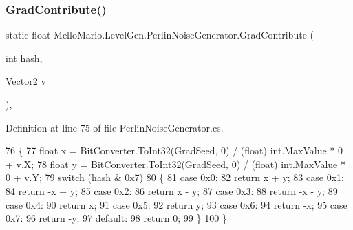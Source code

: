 \subsubsection{Grad\+Contribute()}
{\footnotesize\ttfamily static float Mello\+Mario.\+Level\+Gen.\+Perlin\+Noise\+Generator.\+Grad\+Contribute (\begin{DoxyParamCaption}\item[{int}]{hash,  }\item[{Vector2}]{v }\end{DoxyParamCaption})\hspace{0.3cm}{\ttfamily [static]}, {\ttfamily [private]}}



Definition at line 75 of file Perlin\+Noise\+Generator.\+cs.


\begin{DoxyCode}
76         \{
77             \textcolor{keywordtype}{float} x = BitConverter.ToInt32(GradSeed, 0) / (float) \textcolor{keywordtype}{int}.MaxValue * 0 + v.X;
78             \textcolor{keywordtype}{float} y = BitConverter.ToInt32(GradSeed, 0) / (float) \textcolor{keywordtype}{int}.MaxValue * 0 + v.Y;
79             switch (hash & 0x7)
80             \{
81                 \textcolor{keywordflow}{case} 0x0:
82                     \textcolor{keywordflow}{return} x + y;
83                 \textcolor{keywordflow}{case} 0x1:
84                     \textcolor{keywordflow}{return} -x + y;
85                 \textcolor{keywordflow}{case} 0x2:
86                     \textcolor{keywordflow}{return} x - y;
87                 \textcolor{keywordflow}{case} 0x3:
88                     \textcolor{keywordflow}{return} -x - y;
89                 \textcolor{keywordflow}{case} 0x4:
90                     \textcolor{keywordflow}{return} x;
91                 \textcolor{keywordflow}{case} 0x5:
92                     \textcolor{keywordflow}{return} y;
93                 \textcolor{keywordflow}{case} 0x6:
94                     \textcolor{keywordflow}{return} -x;
95                 \textcolor{keywordflow}{case} 0x7:
96                     \textcolor{keywordflow}{return} -y;
97                 \textcolor{keywordflow}{default}:
98                     \textcolor{keywordflow}{return} 0;
99             \}
100         \}
\end{DoxyCode}
\mbox{\label{classMelloMario_1_1LevelGen_1_1PerlinNoiseGenerator_a99969f74ffa5b2aeac4752656e67b611}} 
